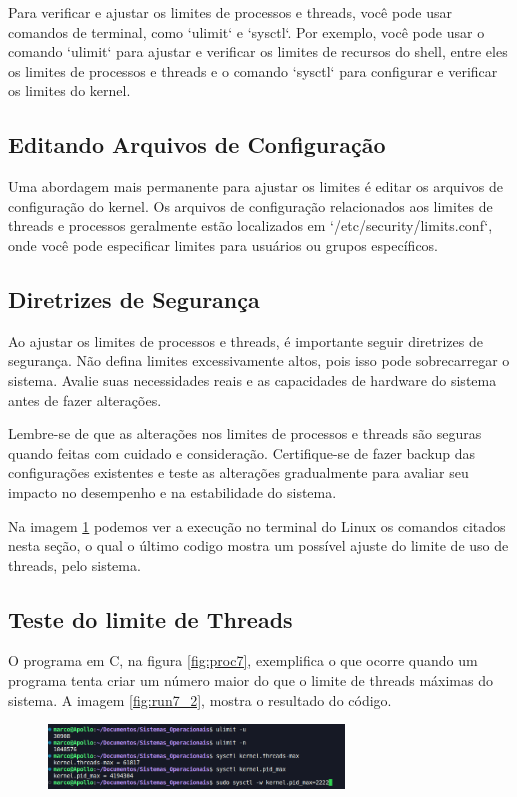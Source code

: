 \documentclass[
	12pt,				%
	openright,			%
	oneside,			%
	a4paper,			%
	chapter=TITLE,		%
	english,			%
	french,				%
	spanish,			%
	brazil				%
	]{abntex2}
\theoremstyle{definition}
\begin{document}
Para verificar e ajustar os limites de processos e threads, você pode usar comandos de terminal, como `ulimit` e `sysctl`. Por exemplo, você pode usar o comando `ulimit` para ajustar e verificar os limites de recursos do shell, entre eles os limites de processos e threads e o comando `sysctl` para configurar e verificar os limites do kernel. 

\subsection{Editando Arquivos de Configuração}

Uma abordagem mais permanente para ajustar os limites é editar os arquivos de configuração do kernel. Os arquivos de configuração relacionados aos limites de threads e processos geralmente estão localizados em `/etc/security/limits.conf`, onde você pode especificar limites para usuários ou grupos específicos.

\subsection{Diretrizes de Segurança}

Ao ajustar os limites de processos e threads, é importante seguir diretrizes de segurança. Não defina limites excessivamente altos, pois isso pode sobrecarregar o sistema. Avalie suas necessidades reais e as capacidades de hardware do sistema antes de fazer alterações.

Lembre-se de que as alterações nos limites de processos e threads são seguras quando feitas com cuidado e consideração. Certifique-se de fazer backup das configurações existentes e teste as alterações gradualmente para avaliar seu impacto no desempenho e na estabilidade do sistema.

Na imagem \ref{fig:run7} podemos ver a execução no terminal do Linux os comandos citados nesta seção, o qual o último codigo mostra um possível ajuste do limite de uso de threads, pelo sistema.

\subsection{Teste do limite de Threads}

O programa em C, na figura \ref{fig:proc7}, exemplifica o que ocorre quando um programa tenta criar um número maior do que o limite de threads máximas do sistema. A imagem  \ref{fig:run7_2}, mostra o resultado do código.
\begin{figure}
    \centering
    \includegraphics[width=0.7\textwidth]{imagens/limites_max.png}
    \caption{}
    \label{fig:run7}
\end{figure}
\end{document}
